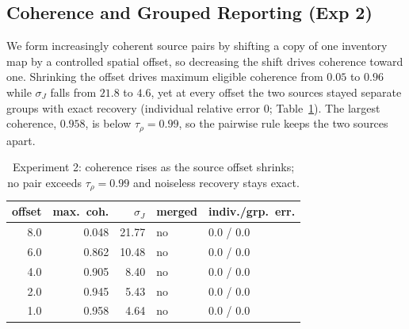 \subsection{Coherence and Grouped Reporting (Exp 2)}
\label{subsec:results_h2}
We form increasingly coherent source pairs by shifting a copy of one inventory map by
a controlled spatial offset, so decreasing the shift drives coherence toward one.
Shrinking the offset drives maximum eligible coherence from $0.05$ to $0.96$ while
$\sigma_J$ falls from $21.8$ to $4.6$, yet at every offset the two sources stayed separate groups with exact recovery
(individual relative error $0$; Table~\ref{tab:results_h2}).  The largest coherence,
$0.958$, is below $\tau_\rho=0.99$, so the pairwise rule keeps the two sources apart.
\begin{table}[t]
\centering
\footnotesize
\caption{Experiment 2: coherence rises as the source offset shrinks; no pair exceeds
\(\tau_\rho=0.99\) and noiseless recovery stays exact.}
\label{tab:results_h2}
\begin{tabular}{rrrll}
\toprule
offset & max.\ coh. & $\sigma_J$ & merged & indiv./grp.\ err. \\
\midrule
8.0 & 0.048 & 21.77 & no & 0.0 / 0.0 \\
6.0 & 0.862 & 10.48 & no & 0.0 / 0.0 \\
4.0 & 0.905 & 8.40  & no & 0.0 / 0.0 \\
2.0 & 0.945 & 5.43  & no & 0.0 / 0.0 \\
1.0 & 0.958 & 4.64  & no & 0.0 / 0.0 \\
\bottomrule
\end{tabular}
\end{table}

